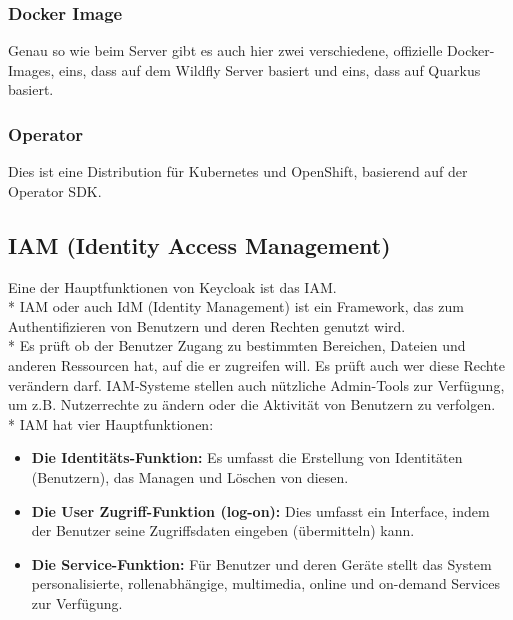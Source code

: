 \subsubsection{Docker Image}
Genau so wie beim Server gibt es auch hier zwei verschiedene, offizielle Docker-Images, eins, dass auf dem Wildfly Server basiert und eins, dass auf Quarkus basiert.
\subsubsection{Operator}
Dies ist eine Distribution für Kubernetes und OpenShift, basierend auf der Operator SDK. \cite{KeyCloakDZone}
\subsection{IAM (Identity Access Management)}
\label{sec:IAM}
Eine der Hauptfunktionen von Keycloak ist das IAM. \\*
IAM oder auch IdM (Identity Management) ist ein Framework, das zum Authentifizieren von Benutzern und deren Rechten genutzt wird. \\*
Es prüft ob der Benutzer Zugang zu bestimmten Bereichen, Dateien und anderen Ressourcen hat, auf die er zugreifen will. Es prüft auch wer diese Rechte verändern darf.
IAM-Systeme stellen auch nützliche Admin-Tools zur Verfügung, um z.B. Nutzerrechte zu ändern oder die Aktivität von Benutzern zu verfolgen. \cite{KeycloakMakeIT} \\*
IAM hat vier Hauptfunktionen:
\begin{itemize}
    \item \textbf{Die Identitäts-Funktion: }Es umfasst die Erstellung von Identitäten (Benutzern), das Managen und Löschen von diesen.  
    \item \textbf{Die User Zugriff-Funktion (log-on): } Dies umfasst ein Interface, indem der Benutzer seine Zugriffsdaten eingeben (übermitteln) kann.
    \item \textbf{Die Service-Funktion: } Für Benutzer und deren Geräte stellt das System personalisierte, rollenabhängige, multimedia, online und on-demand Services zur Verfügung. \cite{KeycloakMakeIT}
\end{itemize}

